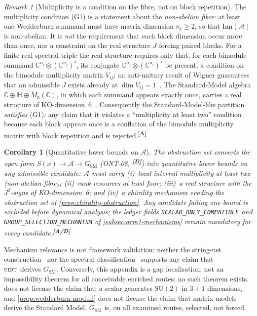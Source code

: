 \documentclass[12pt,a4paper,twoside]{article}
\theoremstyle{plain}
\newtheorem{corollary}[theorem]{Corollary}
\theoremstyle{definition}
\theoremstyle{remark}
\newtheorem{remark}[theorem]{Remark}
\newcommand{\UIDT}{\textsc{uidt}}
\newcommand{\catmark}[1]{\textsuperscript{\textsf{\textbf{[#1]}}}}
\begin{document}
\begin{remark}[Multiplicity is a condition on the fibre, not on block repetition]
\label{rem:multiplicity-precision}
The multiplicity condition (G1) is a statement about the \emph{non-abelian
fibre}: at least one Wedderburn summand must have matrix dimension
$n_i\ge 2$, so that $\mathrm{Inn}(\mathcal{A})$ is non-abelian. It is
\emph{not} the requirement that each block dimension occur more than once,
nor a constraint on the real structure $J$ forcing paired blocks. For a
finite real spectral triple the real structure requires only that, for
each bimodule summand $\mathbb{C}^{n_i}\otimes(\mathbb{C}^{n_j})^{\circ}$,
its conjugate $\mathbb{C}^{n_j}\otimes(\mathbb{C}^{n_i})^{\circ}$ be
present, a condition on the bimodule multiplicity matrix $V_{ij}$; an
anti-unitary result of Wigner guarantees that an admissible $J$ exists
already at $\dim V_{ij}=1$~\cite{vansuijlekom2019}. The Standard-Model
algebra $\mathbb{C}\oplus\mathbb{H}\oplus M_3(\mathbb{C})$, in which each
summand appears exactly once, carries a real structure of
KO-dimension~6~\cite{ccm2007}. Consequently the Standard-Model-like
partition \emph{satisfies} (G1): any claim that it violates a
``multiplicity at least two'' condition because each block appears once is
a conflation of the bimodule multiplicity matrix with block repetition and
is rejected.\catmark{A}
\end{remark}

\begin{corollary}[Quantitative lower bounds on $\mathcal{A}$]
\label{cor:algebra-lower-bounds}
The obstruction set converts the open form
$S(x)\to\mathcal{A}\to G_{\mathrm{SM}}$ (ONT-08, \catmark{D}) into
quantitative lower bounds on any admissible candidate: $\mathcal{A}$ must
carry (i)~local internal multiplicity at least two (non-abelian fibre);
(ii)~rank resources at least four; (iii)~a real structure with the
$J^2$-signs of KO-dimension~6; and (iv)~a chirality mechanism evading the
obstruction set of \cref{prop:chirality-obstruction}. Any candidate
failing one bound is excluded before dynamical analysis; the ledger fields
\texttt{SCALAR\_ONLY\_COMPATIBLE} and \texttt{GROUP\_SELECTION\_MECHANISM}
of \cref{subsec:arm1-mechanisms} remain mandatory for every
candidate.\catmark{A/D}
\end{corollary}

\begin{governancebox}
Mechanism relevance is not framework validation: neither the string-net
construction~\cite{levinwen2005} nor the spectral
classification~\cite{cc2008} supports any claim that \UIDT\ derives
$G_{\mathrm{SM}}$. Conversely, this appendix is a gap localisation, not an
impossibility theorem for all conceivable enriched routes; no such theorem
exists.  does not license the claim that a scalar
generates $\mathrm{SU}(2)$ in $3{+}1$ dimensions, and
\cref{prop:wedderburn-moduli} does not license the claim that matrix
models derive the Standard Model. $G_{\mathrm{SM}}$ is, on all examined
routes, selected, not forced.
\end{governancebox}
\end{document}
